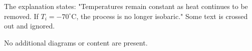 The explanation states:  
"Temperatures remain constant as heat continues to be removed. If \(T_i = -70^\circ\text{C}\), the process is no longer isobaric."  
Some text is crossed out and ignored.  

No additional diagrams or content are present.